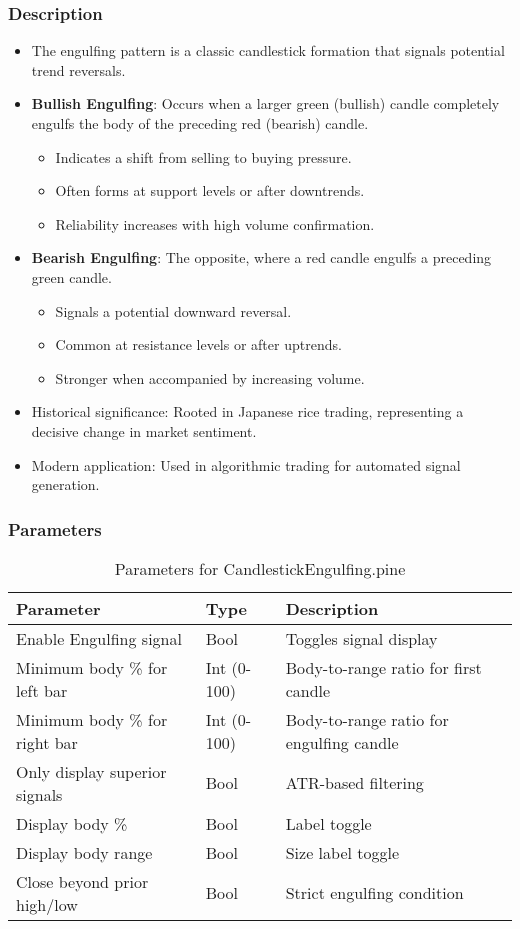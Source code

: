\documentclass[12pt]{article}
\begin{document}
\subsubsection{Description}
\begin{itemize}
\item The engulfing pattern is a classic candlestick formation that signals potential trend reversals.
\item \textbf{Bullish Engulfing}: Occurs when a larger green (bullish) candle completely engulfs the body of the preceding red (bearish) candle.
  \begin{itemize}
  \item Indicates a shift from selling to buying pressure.
  \item Often forms at support levels or after downtrends.
  \item Reliability increases with high volume confirmation.
  \end{itemize}
\item \textbf{Bearish Engulfing}: The opposite, where a red candle engulfs a preceding green candle.
  \begin{itemize}
  \item Signals a potential downward reversal.
  \item Common at resistance levels or after uptrends.
  \item Stronger when accompanied by increasing volume.
  \end{itemize}
\item Historical significance: Rooted in Japanese rice trading, representing a decisive change in market sentiment.
\item Modern application: Used in algorithmic trading for automated signal generation.
\end{itemize}

\subsubsection{Parameters}
\begin{table}[H]
\centering
\caption{Parameters for CandlestickEngulfing.pine}
\label{tab:engulfing_params}
\begin{tabular}{@{}lll@{}}
\toprule
Parameter & Type & Description \\
\midrule
Enable Engulfing signal & Bool & Toggles signal display \\
Minimum body \% for left bar & Int (0-100) & Body-to-range ratio for first candle \\
Minimum body \% for right bar & Int (0-100) & Body-to-range ratio for engulfing candle \\
Only display superior signals & Bool & ATR-based filtering \\
Display body \% & Bool & Label toggle \\
Display body range & Bool & Size label toggle \\
Close beyond prior high/low & Bool & Strict engulfing condition \\
\bottomrule
\end{tabular}
\end{table}
\end{document}
